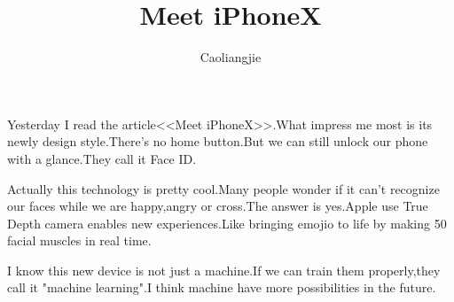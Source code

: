 \documentclass{ctexart}
\begin{document}
\title{Meet iPhoneX}
\author{Caoliangjie}
\maketitle
Yesterday I read the article<<Meet iPhoneX>>.What impress me most is its newly design style.There's no home button.But we can still unlock our phone with a glance.They call it Face ID.
\par
Actually this technology is pretty cool.Many people wonder if it can't recognize our faces while we are happy,angry or cross.The answer is yes.Apple use True Depth camera enables new experiences.Like bringing emojio to life by making 50 facial muscles in real time.
\par
I know this new device is not just a machine.If we can train them properly,they call it "machine learning".I think machine have more possibilities in the future.
\end{document}
